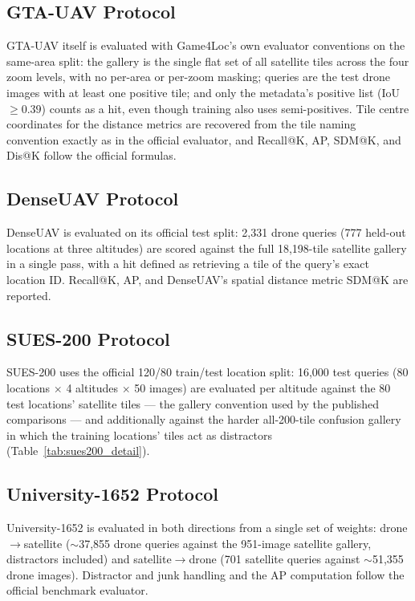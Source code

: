 \documentclass[conference]{IEEEtran}
\begin{document}
\subsection{GTA-UAV Protocol}
GTA-UAV itself is evaluated with Game4Loc's own evaluator conventions on
the same-area split: the gallery is the single flat set of all satellite
tiles across the four zoom levels, with no per-area or per-zoom masking;
queries are the test drone images with at least one positive tile; and only
the metadata's positive list (IoU $\geq 0.39$) counts as a hit, even though
training also uses semi-positives. Tile centre coordinates for the distance
metrics are recovered from the tile naming convention exactly as in the
official evaluator, and Recall@K, AP, SDM@K, and Dis@K follow the official
formulas.

\subsection{DenseUAV Protocol}
DenseUAV is evaluated on its official test split: 2,331 drone queries
(777 held-out locations at three altitudes) are scored against the full
18,198-tile satellite gallery in a single pass, with a hit defined as
retrieving a tile of the query's exact location ID. Recall@K, AP, and
DenseUAV's spatial distance metric SDM@K are reported.

\subsection{SUES-200 Protocol}
SUES-200 uses the official 120/80 train/test location split: 16,000 test
queries (80 locations $\times$ 4 altitudes $\times$ 50 images) are
evaluated per altitude against the 80 test locations' satellite tiles — the
gallery convention used by the published comparisons — and additionally
against the harder all-200-tile confusion gallery in which the training
locations' tiles act as distractors (Table~\ref{tab:sues200_detail}).

\subsection{University-1652 Protocol}
University-1652 is evaluated in both directions from a single set of
weights: drone$\to$satellite ($\sim$37,855 drone queries against the
951-image satellite gallery, distractors included) and
satellite$\to$drone (701 satellite queries against $\sim$51,355 drone
images). Distractor and junk handling and the AP computation follow the
official benchmark evaluator.
\end{document}
